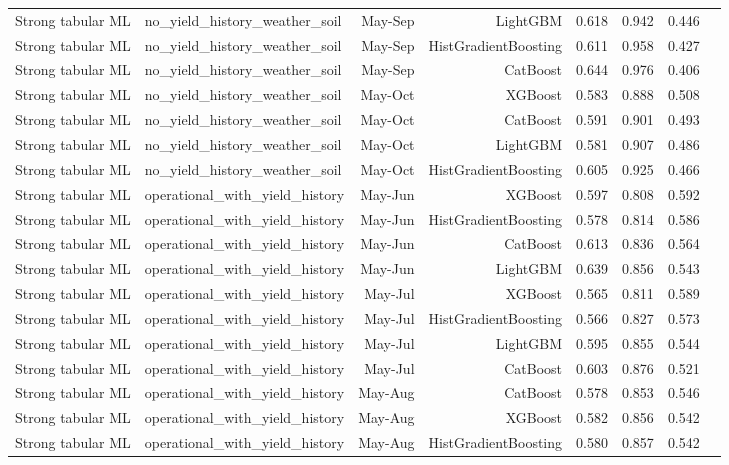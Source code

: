 \begin{tabular}{llrrrrrr}
Strong tabular ML & no\_yield\_history\_weather\_soil & May-Sep & LightGBM & 0.618 & 0.942 & 0.446 \\
Strong tabular ML & no\_yield\_history\_weather\_soil & May-Sep & HistGradientBoosting & 0.611 & 0.958 & 0.427 \\
Strong tabular ML & no\_yield\_history\_weather\_soil & May-Sep & CatBoost & 0.644 & 0.976 & 0.406 \\
Strong tabular ML & no\_yield\_history\_weather\_soil & May-Oct & XGBoost & 0.583 & 0.888 & 0.508 \\
Strong tabular ML & no\_yield\_history\_weather\_soil & May-Oct & CatBoost & 0.591 & 0.901 & 0.493 \\
Strong tabular ML & no\_yield\_history\_weather\_soil & May-Oct & LightGBM & 0.581 & 0.907 & 0.486 \\
Strong tabular ML & no\_yield\_history\_weather\_soil & May-Oct & HistGradientBoosting & 0.605 & 0.925 & 0.466 \\
Strong tabular ML & operational\_with\_yield\_history & May-Jun & XGBoost & 0.597 & 0.808 & 0.592 \\
Strong tabular ML & operational\_with\_yield\_history & May-Jun & HistGradientBoosting & 0.578 & 0.814 & 0.586 \\
Strong tabular ML & operational\_with\_yield\_history & May-Jun & CatBoost & 0.613 & 0.836 & 0.564 \\
Strong tabular ML & operational\_with\_yield\_history & May-Jun & LightGBM & 0.639 & 0.856 & 0.543 \\
Strong tabular ML & operational\_with\_yield\_history & May-Jul & XGBoost & 0.565 & 0.811 & 0.589 \\
Strong tabular ML & operational\_with\_yield\_history & May-Jul & HistGradientBoosting & 0.566 & 0.827 & 0.573 \\
Strong tabular ML & operational\_with\_yield\_history & May-Jul & LightGBM & 0.595 & 0.855 & 0.544 \\
Strong tabular ML & operational\_with\_yield\_history & May-Jul & CatBoost & 0.603 & 0.876 & 0.521 \\
Strong tabular ML & operational\_with\_yield\_history & May-Aug & CatBoost & 0.578 & 0.853 & 0.546 \\
Strong tabular ML & operational\_with\_yield\_history & May-Aug & XGBoost & 0.582 & 0.856 & 0.542 \\
Strong tabular ML & operational\_with\_yield\_history & May-Aug & HistGradientBoosting & 0.580 & 0.857 & 0.542 \\

\end{tabular}
